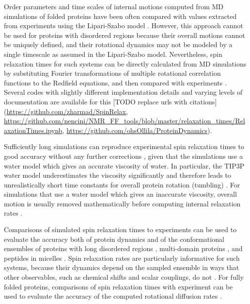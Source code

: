 \documentclass[9pt,review]{livecoms}
\begin{document}
Order parameters and time scales of internal motions computed from MD simulations of folded proteins have been often compared with values extracted from experiments using the Lipari-Szabo model \cite{lipari_protein_1982,best_determination_2004,showalter_toward_2007,showalter_validation_2007,maragakis_microsecond_2008,trbovic_structural_2008,fenwick_classic_2016}.
However, this approach cannot be used for proteins with disordered regions because their overall motions cannot be uniquely defined, and their rotational dynamics may not be modeled by a single timescale as assumed in the Lipari-Szabo model.
Nevertheless, spin relaxation times for such systems can be directly calculated from MD simulations by substituting Fourier transformations of multiple rotational correlation functions to the Redfield equations, and then compared with experiments \cite{chen_ab_2018,ollila_rotational_2018,hoffmann_predicting_2020,virtanen_heterogeneous_2020}.
Several codes with slightly different implementation details and varying levels of documentation are available for this [TODO replace urls with citations] (\url{https://github.com/zharmad/SpinRelax}, \url{https://github.com/nencini/NMR_FF_tools/blob/master/relaxation_times/RelaxationTimes.ipynb}, \url{https://github.com/ohsOllila/ProteinDynamics}).

Sufficiently long simulations \cite{bowman_accurately_2016} can reproduce experimental spin relaxation times to good accuracy without any further corrections \cite{virtanen_heterogeneous_2020}, given that the simulations use a water model which gives an accurate viscosity of water.
In particular, the TIP3P water model \cite{jorgensen_comparison_1983} underestimates the viscosity significantly and therefore leads to unrealistically short time constants for overall protein rotation (tumbling) \cite{wong_evaluating_2008}.
For simulations that use a water model which gives an inaccurate viscosity, overall motion is usually removed mathematically before computing internal relaxation rates \cite{prompers_general_2002,wong_evaluating_2008,anderson_rotational_2012,chen_ab_2018,hoffmann_accurate_2018,ollila_rotational_2018}.

Comparisons of simulated spin relaxation times to experiments can be used to evaluate the accuracy both of protein dynamics and of the conformational ensembles of proteins with long disordered regions \cite{lindorff2012structure,virtanen_heterogeneous_2020}, multi-domain proteins \cite{sandelin_qebss_2024}, and peptides in micelles \cite{nencini_probing_2024}.
Spin relaxation rates are particularly informative for such systems, because their dynamics depend on the sampled ensemble in ways that other observables, such as chemical shifts and scalar couplings, do not \cite{virtanen_heterogeneous_2020}.
For fully folded proteins, comparisons of spin relaxation times with experiment can be used to evaluate the accuracy of the computed rotational diffusion rates \cite{ollila_rotational_2018}.
\end{document}
